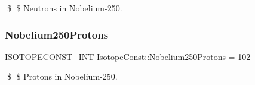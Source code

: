 \$ \$ Neutrons in Nobelium-\/250. \mbox{\label{group___isotope_const-_nobelium-_no250_ga7bb8971a01f2ac90044945fcab8a0929}} 
\subsubsection{\texorpdfstring{Nobelium250\+Protons}{Nobelium250Protons}}
{\footnotesize\ttfamily \mbox{\hyperlink{group___isotope_const-_macros_ga5f18360b3e99483a35c32d789e62621c}{I\+S\+O\+T\+O\+P\+E\+C\+O\+N\+S\+T\+\_\+\+I\+NT}} Isotope\+Const\+::\+Nobelium250\+Protons = 102}

\$ \$ Protons in Nobelium-\/250. 